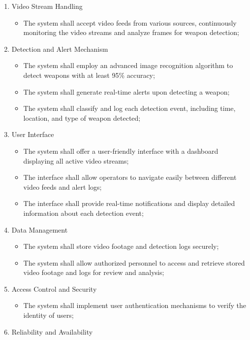 \begin{enumerate}
    \item Video Stream Handling
    \begin{itemize}
    \item The system shall accept video feeds from various sources, continuously monitoring the video streams 
    and analyze frames for weapon detection;
    \end{itemize}
    \item Detection and Alert Mechanism
    \begin{itemize}
    \item The system shall employ an advanced image recognition algorithm to detect weapons with at least 95\% accuracy;
    \item The system shall generate real-time alerts upon detecting a weapon;
    \item The system shall classify and log each detection event, including time, location, and type of weapon detected;
    \end{itemize}
    \item User Interface
    \begin{itemize}
    \item The system shall offer a user-friendly interface with a dashboard displaying all active video streams;
    \item The interface shall allow operators to navigate easily between different video feeds and alert logs;
    \item The interface shall provide real-time notifications and display detailed information about each detection event;
    \end{itemize}
    \item Data Management
    \begin{itemize}
    \item The system shall store video footage and detection logs securely;
    \item The system shall allow authorized personnel to access and retrieve stored video footage and 
    logs for review and analysis;
    \end{itemize}
    \item Access Control and Security
    \begin{itemize}
    \item The system shall implement user authentication mechanisms to verify the identity of users;
    \end{itemize}
    \item Reliability and Availability

\end{enumerate}
